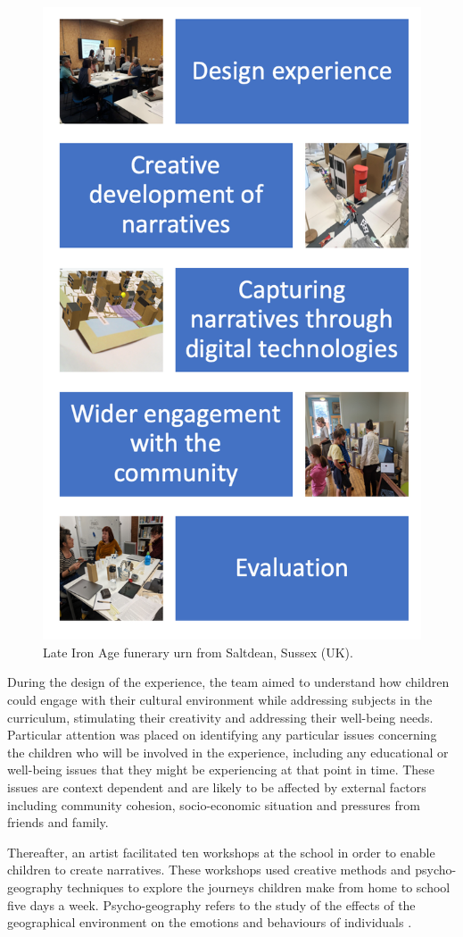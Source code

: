 \documentclass[acmlarge,screen,dvipsnames]{acmart}
\begin{document}
\begin{figure}[b]
  \centering
  \includegraphics[width=0.6\linewidth]{images/method}
  \caption{\label{fig:pot}
    Late Iron Age funerary urn from Saltdean, Sussex (UK).}
\end{figure}


During the design of the experience, the team aimed to understand how children
could engage with their cultural environment while addressing subjects in the
curriculum, stimulating their creativity and addressing their well-being
needs. Particular attention was placed on identifying any particular issues
concerning the children who will be involved in the experience, including any
educational or well-being issues that they might be experiencing at that point
in time. These issues are context dependent and are likely to be affected by
external factors including community cohesion, socio-economic situation and
pressures from friends and family.

Thereafter, an artist facilitated ten workshops at the school in order to
enable children to create narratives. These workshops used creative methods
and psycho-geography techniques to explore the journeys children make from home
to school five days a week. Psycho-geography refers to the study of the effects
of the geographical environment on the emotions and behaviours of individuals
\cite{coverley2006psychogeography}. 
\end{document}
